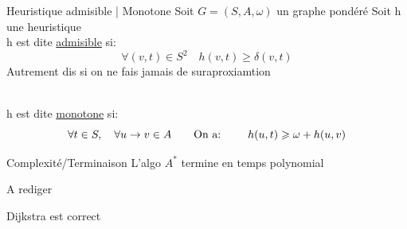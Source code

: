 \documentclass[a4paper,french,bookmarks]{article}
\begin{document}
    \begin{definition}{Heuristique admisible | Monotone}{}
        Soit $G = (S,A,\omega) $ un graphe pondéré
        Soit h une heuristique 
        \\
        
         h est dite \underline{admisible} si: \[  \forall (v,t) \in S^2 \quad h(v,t) \geqslant \delta(v,t) \]
        Autrement dis si on ne fais jamais de suraproxiamtion
        
        \\
        h est dite \underline{monotone} si: \[ \forall t \in S,\quad \forall u \to v \in A \text{\quad  \quad On a:  }\quad \quad h(u,t) \geqslant \omega + h(u,v) \]
    \end{definition}
    
    
    
    \begin{property}{Complexité/Terminaison}{}
        L'algo $A^*$ termine en temps polynomial 
    \end{property}
    \begin{nproof}{}{}
        A rediger 
    \end{nproof}
    \begin{corollary}{}{}
        Dijkstra est correct 
    \end{corollary}
    
    \begin{definition}{}{}
        
    \end{definition}
\end{document}
